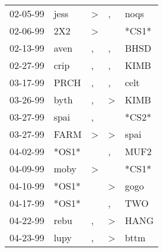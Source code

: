 \begin{supertabular}{p{0.07\textwidth}p{0.06\textwidth}p{0.02\textwidth}p{0.02\textwidth}p{0.06\textwidth}}
          02-05-99\textsuperscript{} &           jess\textsuperscript{} &     \textgreater &                , &           noqs\textsuperscript{} \\
          02-06-99\textsuperscript{} &            2X2\textsuperscript{} &     \textgreater &                  &                            *CS1* \\
          02-13-99\textsuperscript{} &           aven\textsuperscript{} &                , &                , &           BHSD\textsuperscript{} \\
          02-27-99\textsuperscript{} &           crip\textsuperscript{} &                , &                , &           KIMB\textsuperscript{} \\
          03-17-99\textsuperscript{} &           PRCH\textsuperscript{} &                , &                , &           celt\textsuperscript{} \\
          03-26-99\textsuperscript{} &           byth\textsuperscript{} &                , &     \textgreater &           KIMB\textsuperscript{} \\
          03-27-99\textsuperscript{} &           spai\textsuperscript{} &                , &                  &                            *CS2* \\
          03-27-99\textsuperscript{} &           FARM\textsuperscript{} &     \textgreater &     \textgreater &           spai\textsuperscript{} \\
          04-02-99\textsuperscript{} &                            *OS1* &                  &                , &           MUF2\textsuperscript{} \\
          04-09-99\textsuperscript{} &           moby\textsuperscript{} &     \textgreater &                  &                            *CS1* \\
          04-10-99\textsuperscript{} &                            *OS1* &                  &     \textgreater &           gogo\textsuperscript{} \\
          04-17-99\textsuperscript{} &                            *OS1* &                  &                , &            TWO\textsuperscript{} \\
          04-22-99\textsuperscript{} &           rebu\textsuperscript{} &                , &     \textgreater &           HANG\textsuperscript{} \\
          04-23-99\textsuperscript{} &           lupy\textsuperscript{} &                , &     \textgreater &           bttm\textsuperscript{} \\

\end{supertabular}
